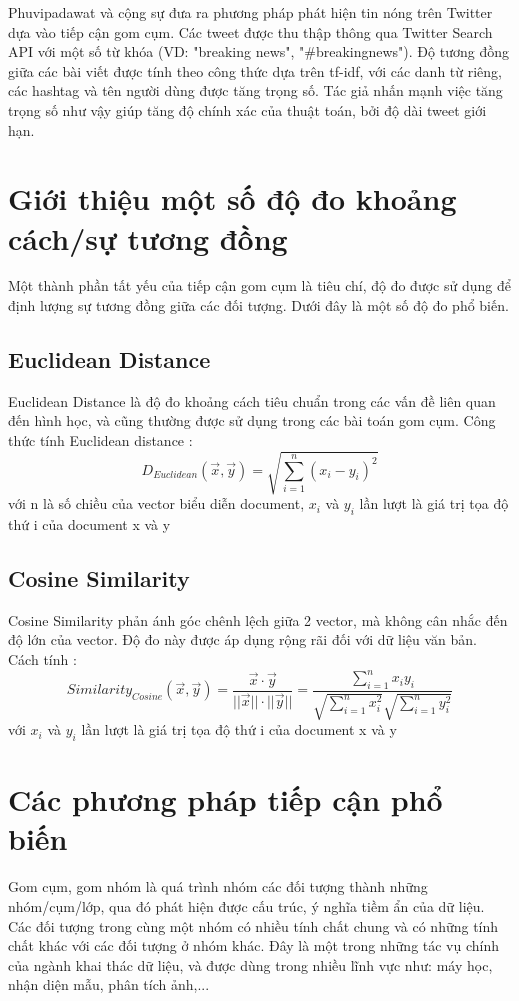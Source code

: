 Phuvipadawat và cộng sự \cite{SwitPhuvipadawat} đưa ra phương pháp phát hiện tin nóng trên Twitter dựa vào tiếp cận gom cụm. Các tweet được thu thập thông qua Twitter Search API với một số từ khóa (VD: "breaking news", "\#breakingnews"). Độ tương đồng giữa các bài viết được tính theo công thức dựa trên tf-idf, với các danh từ riêng, các hashtag và tên người dùng được tăng trọng số. Tác giả nhấn mạnh việc tăng trọng số như vậy giúp tăng độ chính xác của thuật toán, bởi độ dài tweet giới hạn.

\section{Giới thiệu một số độ đo khoảng cách/sự tương đồng} \label{distances}
Một thành phần tất yếu của tiếp cận gom cụm là tiêu chí, độ đo được sử dụng để định lượng sự tương đồng giữa các đối tượng. Dưới đây là một số độ đo phổ biến.
	\subsection*{Euclidean Distance}
	Euclidean Distance là độ đo khoảng cách tiêu chuẩn trong các vấn đề liên quan đến hình học, và cũng thường được sử dụng trong các bài toán gom cụm. Công thức tính Euclidean distance \cite{IntroToIR}:
		\begin{equation}
		D_{Euclidean}(\vec{x}, \vec{y}) = \sqrt{\sum_{i=1}^n (x_i-y_i)^2}
		\end{equation}
	với n là số chiều của vector biểu diễn document, $x_i$ và $y_i$ lần lượt là giá trị tọa độ thứ i của document x và y\\
	
	\subsection*{Cosine Similarity}
	Cosine Similarity phản ánh góc chênh lệch giữa 2 vector, mà không cân nhắc đến độ lớn của vector. Độ đo này được áp dụng rộng rãi đối với dữ liệu văn bản. Cách tính \cite{IntroToIR}: 
		\begin{equation}
		Similarity_{Cosine}(\vec{x}, \vec{y}) = \frac {\vec{x} \cdot \vec{y}}{||\vec{x}|| \cdot ||\vec{y}||} = \frac{\sum_{i=1}^{n}x_iy_i}{\sqrt{\sum_{i=1}^{n}x_i^2} \sqrt{\sum_{i=1}^{n}y_i^2}}	
		\end{equation}
	với  $x_i$ và $y_i$ lần lượt là giá trị tọa độ thứ i của document x và y

\section{Các phương pháp tiếp cận phổ biến}
Gom cụm, gom nhóm là quá trình nhóm các đối tượng thành những nhóm/cụm/lớp, qua đó phát hiện được cấu trúc, ý nghĩa tiềm ẩn của dữ liệu. Các đối tượng trong cùng một nhóm có nhiều tính chất chung và có những tính chất khác với các đối tượng ở nhóm khác. Đây là một trong những tác vụ chính của ngành khai thác dữ liệu, và được dùng trong nhiều lĩnh vực như: máy học, nhận diện mẫu, phân tích ảnh,...

